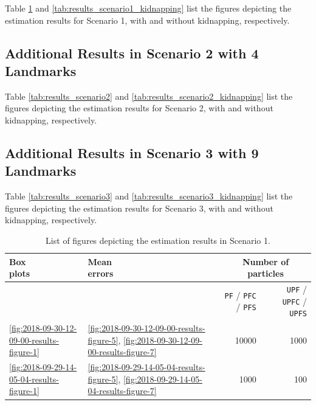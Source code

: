 Table \ref{tab:results_scenario1} and \ref{tab:results_scenario1_kidnapping} list the figures depicting the estimation results for Scenario 1, with and without kidnapping, respectively.

\subsection*{Additional Results in Scenario 2 with 4 Landmarks}

Table \ref{tab:results_scenario2} and \ref{tab:results_scenario2_kidnapping} list the figures depicting the estimation results for Scenario 2, with and without kidnapping, respectively.

\subsection*{Additional Results in Scenario 3 with 9 Landmarks}

Table \ref{tab:results_scenario3} and \ref{tab:results_scenario3_kidnapping} list the figures depicting the estimation results for Scenario 3, with and without kidnapping, respectively.

\begin{table}
\centering
{}\begin{tabular}{@{}llrrrr@{}}
\toprule
\thead{\normalsize Box \\ \normalsize plots} & \thead{\normalsize Mean \\ \normalsize errors} & \phantom{a} & \multicolumn{3}{c}{Number of particles} \\
\midrule
& & & \texttt{PF} / \texttt{PFC} / \texttt{PFS} & \phantom{a} & \texttt{UPF} / \texttt{UPFC} / \texttt{UPFS} \\
\cmidrule{4-4} \cmidrule{6-6}
\ref{fig:2018-09-30-12-09-00-results-figure-1} & \ref{fig:2018-09-30-12-09-00-results-figure-5}, \ref{fig:2018-09-30-12-09-00-results-figure-7} & & 10000 & & 1000 \\ 
\ref{fig:2018-09-29-14-05-04-results-figure-1} & \ref{fig:2018-09-29-14-05-04-results-figure-5}, \ref{fig:2018-09-29-14-05-04-results-figure-7} & & 1000 & & 100 \\
\bottomrule
\end{tabular}
\caption{List of figures depicting the estimation results in Scenario 1.}
\label{tab:results_scenario1}
\end{table}


